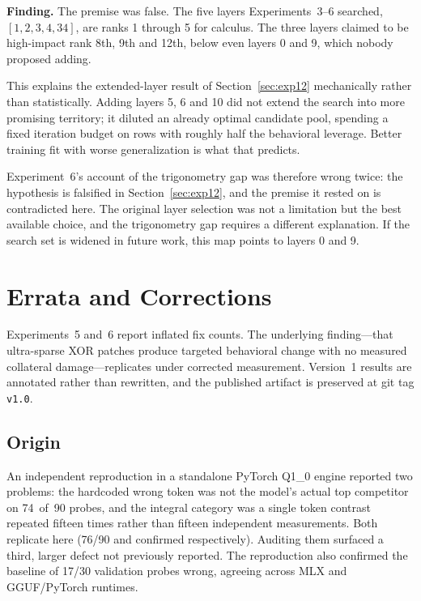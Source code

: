 \documentclass[11pt,a4paper]{article}
\begin{document}
\textbf{Finding.} The premise was false. The five layers Experiments~3--6
searched, $[1,2,3,4,34]$, are ranks 1 through 5 for calculus. The three layers
claimed to be high-impact rank 8th, 9th and 12th, below even layers 0 and 9,
which nobody proposed adding.

This explains the extended-layer result of Section~\ref{sec:exp12} mechanically
rather than statistically. Adding layers 5, 6 and 10 did not extend the search
into more promising territory; it diluted an already optimal candidate pool,
spending a fixed iteration budget on rows with roughly half the behavioral
leverage. Better training fit with worse generalization is what that predicts.

Experiment~6's account of the trigonometry gap was therefore wrong twice: the
hypothesis is falsified in Section~\ref{sec:exp12}, and the premise it rested on
is contradicted here. The original layer selection was not a limitation but the
best available choice, and the trigonometry gap requires a different explanation.
If the search set is widened in future work, this map points to layers 0 and 9.

\section{Errata and Corrections}
\label{sec:errata}

Experiments~5 and~6 report inflated fix counts. The underlying finding---that
ultra-sparse XOR patches produce targeted behavioral change with no measured
collateral damage---replicates under corrected measurement. Version~1 results
are annotated rather than rewritten, and the published artifact is preserved at
git tag \texttt{v1.0}.

\subsection{Origin}

An independent reproduction in a standalone PyTorch Q1\_0 engine reported two
problems: the hardcoded wrong token was not the model's actual top competitor on
74~of~90 probes, and the integral category was a single token contrast repeated
fifteen times rather than fifteen independent measurements. Both replicate here
(76/90 and confirmed respectively). Auditing them surfaced a third, larger defect
not previously reported. The reproduction also confirmed the baseline of 17/30
validation probes wrong, agreeing across MLX and GGUF/PyTorch runtimes.
\end{document}
